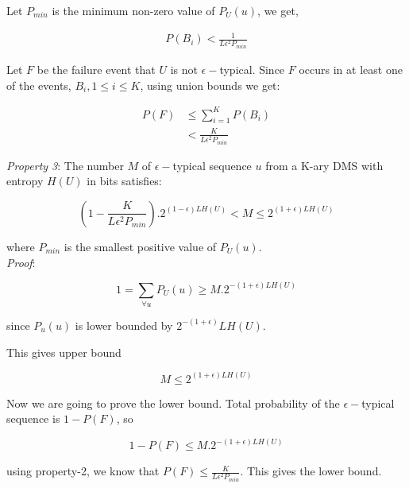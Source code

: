 \documentclass[11pt]{article}
\begin{document}
Let $P_{min}$ is the minimum non-zero value of $P_{U}(u)$, we get,

\begin{equation}
\begin{split}
P(B_i) < \frac{1}{L \epsilon^{2}P_{min}}
\end{split}
\end{equation}

Let $F$ be the failure event that $U$ is not $\epsilon-$typical. Since $F$ occurs in at least one of the events, $B_i, 1 \leq i \leq K$, using union bounds we get:

\begin{equation}
\begin{split}
P(F) &\leq \sum_{i=1}^{K}P(B_i) \\
& < \frac{K}{L \epsilon^2 P_{min}}
\end{split}
\end{equation}


\textit{Property 3}: The number $M$ of $\epsilon-$typical sequence $u$ from a K-ary DMS with entropy $H(U)$ in bits satisfies:

\begin{equation}
(1 - \frac{K}{L \epsilon^2 P_{min}}) . 2^{(1-\epsilon)LH(U)} < M \leq 2^{(1 + \epsilon)LH(U)}
\end{equation}

where $P_{min}$ is the smallest positive value of $P_{U}(u)$. \\

\textit{Proof}:

\begin{equation}
1 = \sum_{\forall u} P_{U}(u) \geq M . 2 ^{-(1 + \epsilon)LH(U)}
\end{equation}

since $P_u(u)$ is lower bounded by $2^{-(1+\epsilon)}LH(U)$.

This gives upper bound 

\begin{equation}
M \leq 2 ^ {(1 + \epsilon)LH(U)}
\end{equation}

Now we are going to prove the lower bound. Total probability of the $\epsilon-$typical sequence is $1-P(F)$, so

\begin{equation}
1 - P(F) \leq M . 2 ^ {-(1 + \epsilon)LH(U)}
\end{equation}

using property-2, we know that $P(F) \leq \frac{K}{L \epsilon ^2 P_{min}}$. This gives the lower bound.
\end{document}
